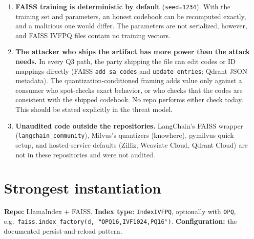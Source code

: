 \documentclass[10pt]{article}
\begin{document}
\begin{enumerate}
  for detection is present. This is not true of FAISS IVFPQ or LlamaIndex+FAISS.
\item \textbf{FAISS training is deterministic by default} (\texttt{seed=1234}). With the training
  set and parameters, an honest codebook can be recomputed exactly, and a malicious one would
  differ. The parameters are not serialized, however, and FAISS IVFPQ files contain no training
  vectors.
\item \textbf{The attacker who ships the artifact has more power than the attack needs.} In
  every Q3 path, the party shipping the file can edit codes or ID mappings directly
  (FAISS \texttt{add\_sa\_codes} and \texttt{update\_entries}; Qdrant JSON metadata). The
  quantization-conditioned framing adds value only against a consumer who spot-checks exact
  behavior, or who checks that the codes are consistent with the shipped codebook. No repo
  performs either check today. This should be stated explicitly in the threat model.
\item \textbf{Unaudited code outside the repositories.} LangChain's FAISS wrapper
  (\texttt{langchain\_community}), Milvus's quantizers (knowhere), pymilvus quick setup, and
  hosted-service defaults (Zilliz, Weaviate Cloud, Qdrant Cloud) are not in these repositories
  and were not audited.
\end{enumerate}

\section{Strongest instantiation}\label{sec:strongest}
\textbf{Repo:} LlamaIndex + FAISS. \textbf{Index type:} \texttt{IndexIVFPQ}, optionally with
\texttt{OPQ}, e.g.\ \texttt{faiss.index\_factory(d, "OPQ16,IVF1024,PQ16")}.
\textbf{Configuration:} the documented persist-and-reload pattern.
\end{document}
